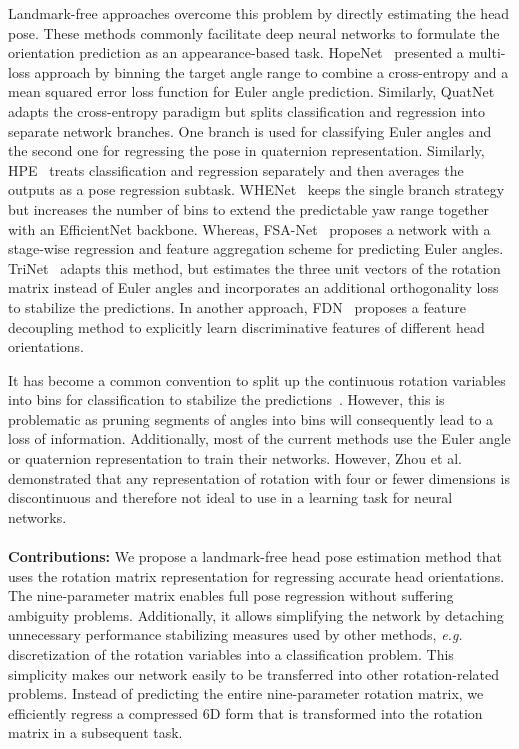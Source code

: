 \documentclass{article}
\begin{document}
Landmark-free approaches overcome this problem by directly estimating the head pose. These methods commonly facilitate deep neural networks to formulate the orientation prediction as an appearance-based task. HopeNet~\cite{Ruiz2018FineGrainedHP} presented a multi-loss approach by binning the target angle range to combine a cross-entropy and a mean squared error loss function for Euler angle prediction. Similarly, QuatNet~\cite{8444061} adapts the cross-entropy paradigm but splits classification and regression into separate network branches. One branch is used for classifying Euler angles and the second one for regressing the pose in quaternion representation. Similarly, HPE~\cite{Huang2020ImprovingHP} treats classification and regression separately and then averages the outputs as a pose regression subtask. WHENet~\cite{Zhou2020WHENetRF} keeps the single branch strategy but increases the number of bins to extend the predictable yaw range together with an EfficientNet backbone. Whereas, FSA-Net~\cite{Yang_2019_CVPR} proposes a network with a stage-wise regression and feature aggregation scheme for predicting Euler angles. TriNet~\cite{Cao_2021_WACV} adapts this method, but estimates the three unit vectors of the rotation matrix instead of Euler angles and incorporates an additional orthogonality loss to stabilize the predictions. In another approach, FDN~\cite{Zhang2020FDNFD} proposes a feature decoupling method to explicitly learn discriminative features of different head orientations.

It has become a common convention to split up the continuous rotation variables into bins for classification to stabilize the predictions~\cite{Ruiz2018FineGrainedHP,8444061,Huang2020ImprovingHP,Zhou2020WHENetRF,Zhang2020FDNFD}. However, this is problematic as pruning segments of angles into bins will consequently lead to a loss of information. Additionally, most of the current methods use the Euler angle or quaternion representation to train their networks. However, Zhou et al.~\cite{Zhou2019OnTC} demonstrated that any representation of rotation with four or fewer dimensions is discontinuous and therefore not ideal to use in a learning task for neural networks. 
\\
\\
\textbf{Contributions:} We propose a landmark-free head pose estimation method that uses the rotation matrix representation for regressing accurate head orientations. The nine-parameter matrix enables full pose regression without suffering ambiguity problems. Additionally, it allows simplifying the network by detaching unnecessary performance stabilizing measures used by other methods, \textit{e.g.} discretization of the rotation variables into a classification problem. This simplicity makes our network easily to be transferred into other rotation-related problems. Instead of predicting the entire nine-parameter rotation matrix, we efficiently regress a compressed 6D form that is transformed into the rotation matrix in a subsequent task. 
\end{document}
